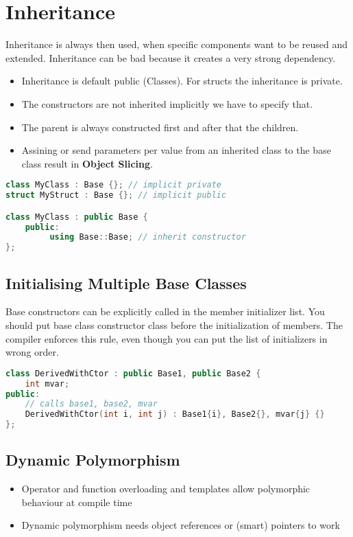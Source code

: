 \section{Inheritance}
Inheritance is always then used, when specific components want to be reused and extended. Inheritance can be bad because it creates a very strong dependency.

\begin{itemize}
  \itemsep -0.5em 
  \item Inheritance is default public (Classes). For structs the inheritance is private.
  \item The constructors are not inherited implicitly we have to specify that.
  \item The parent is always constructed first and after that the children.
  \item Assining or send parameters per value from an inherited class to the base class result in \textbf{Object Slicing}.
\end{itemize}

\begin{lstlisting}[language=C++]
class MyClass : Base {}; // implicit private 
struct MyStruct : Base {}; // implicit public 

class MyClass : public Base {
	public:
		 using Base::Base; // inherit constructor
};
\end{lstlisting}

\subsection{Initialising Multiple Base Classes}
 Base constructors can be explicitly called in the member initializer list. You should put base class constructor class before the initialization of members. The compiler enforces this rule, even though you can put the list of initializers in wrong order.
 
 \begin{lstlisting}[language=C++]
class DerivedWithCtor : public Base1, public Base2 {
	int mvar; 
public:
	// calls base1, base2, mvar
	DerivedWithCtor(int i, int j) : Base1{i}, Base2{}, mvar{j} {}
};
\end{lstlisting}

\subsection{Dynamic Polymorphism}
\begin{itemize}
  \itemsep -0.5em 
  \item Operator and function overloading and templates allow polymorphic behaviour at compile time
  \item Dynamic polymorphism needs object references or (smart) pointers to work
\end{itemize}


